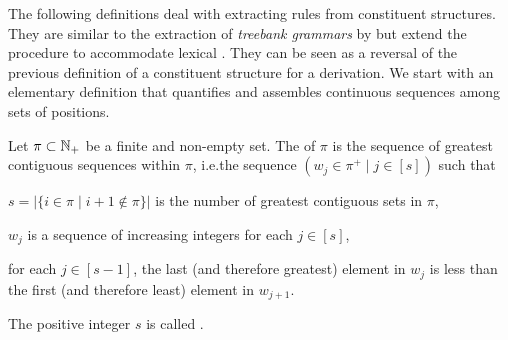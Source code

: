 \documentclass[../../document.tex]{subfiles}
\begin{document}
    \null\hfill
    \hfill
    \hfill\exampleqed

    \vspace{\baselineskip}

    The following definitions deal with extracting  rules from constituent structures.
    They are similar to the extraction of \emph{treebank grammars} by \citet{MaierSogaard08} but extend the procedure to accommodate lexical . They can be seen as a reversal of the previous definition of a constituent structure for a derivation.
    We start with an elementary definition that quantifies and assembles continuous sequences among sets of positions.

    \begin{definition}[Linearization]
        Let \(\pi \subset \mathbb{N}_+\) be a finite and non-empty set.
        The  of \(\pi\) is the sequence of greatest contiguous sequences within \(\pi\), i.e.\@ the sequence \((w_j \in \pi^+ \mid j \in [s])\) such that
        \begin{compactitem}
            \item \(s = |\{i \in \pi \mid i+1 \notin \pi\}|\) is the number of greatest contiguous sets in \(\pi\),
            \item \(w_j\) is a sequence of increasing integers for each \(j \in [s]\),
            \item for each \(j \in [s-1]\), the last (and therefore greatest) element in \(w_j\) is less than the first (and therefore least) element in \(w_{j+1}\).
        \end{compactitem}
        The positive integer \(s\) is called .
    \end{definition}
\end{document}
